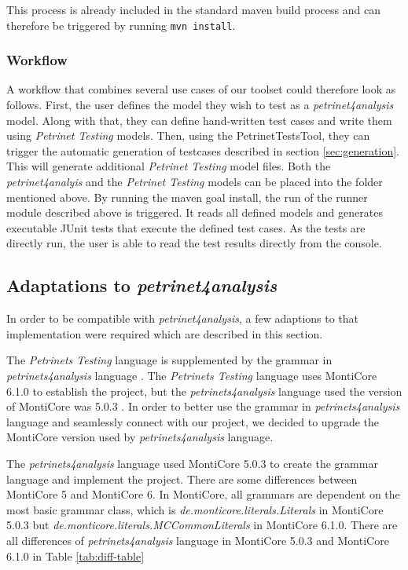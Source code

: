 This process is already included in the standard maven build process and can therefore be triggered by running \texttt{mvn install}.

\subsubsection{Workflow}
A workflow that combines several use cases of our toolset could therefore look as follows.
First, the user defines the model they wish to test as a \emph{petrinet4analysis} model. Along with that, they can define hand-written test cases and write them using \textit{Petrinet Testing} models.
Then, using the PetrinetTestsTool, they can trigger the automatic generation of testcases described in section \ref{sec:generation}. This will generate additional \textit{Petrinet Testing} model files. 
Both the \textit{petrinet4analyis} and the \textit{Petrinet Testing} models can be placed into the folder mentioned above. By running the maven goal install, the run of the runner module described above is triggered. It reads all defined models and generates executable JUnit tests that execute the defined test cases. As the tests are directly run, the user is able to read the test results directly from the console.

\subsection{Adaptations to \emph{petrinet4analysis}}

In order to be compatible with \textit{petrinet4analysis}, a few adaptions to that implementation were required which are described in this section.

The \emph{Petrinets Testing} language is supplemented by the grammar in \emph{petrinets4analysis} language \cite{Hein}. The \emph{Petrinets Testing} language uses MontiCore 6.1.0 \cite{monticore2020} to establish the project, but the \emph{petrinets4analysis} language used the version of MontiCore was 5.0.3 \cite{rumpe2017monticore}. In order to better use the grammar in \emph{petrinets4analysis} language and seamlessly connect with our project, we decided to upgrade the MontiCore version used by \emph{petrinets4analysis} language.


The \emph{petrinets4analysis} language used MontiCore 5.0.3 to create the grammar language and implement the project. There are some differences between MontiCore 5 and MontiCore 6. In MontiCore, all grammars are dependent on the most basic grammar class, which is \emph{de.monticore.literals.Literals} in MontiCore 5.0.3 but \emph{de.monticore.literals.MCCommonLiterals} in MontiCore 6.1.0. There are all differences of \emph{petrinets4analysis} language in MontiCore 5.0.3 and MontiCore 6.1.0 in Table \ref{tab:diff-table}

